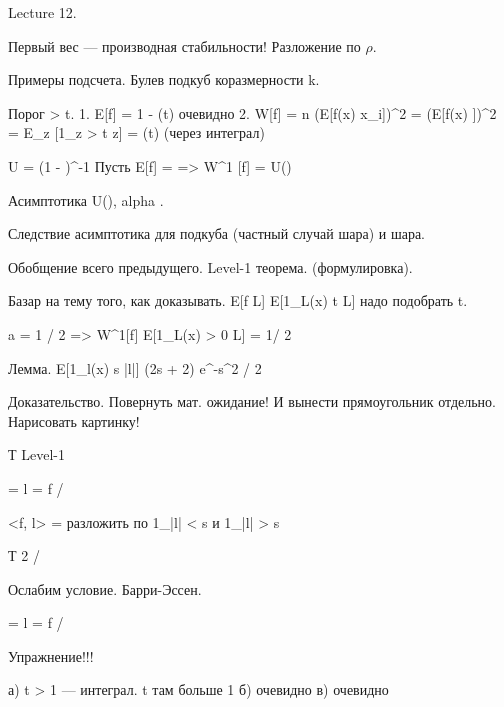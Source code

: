 Lecture 12.


Первый вес --- производная стабильности! Разложение по $\rho$.

Примеры подсчета.
Булев подкуб коразмерности k.

Порог > t. 
1. E[f] = 1 - \Phi(t) очевидно
2. W[f] = n (E[f(x) x_i])^2 = (E[f(x) \sum {}])^2 = E_z [1_{z > t} z] = \phi(t) (через интеграл)


U = \phi (1 - \Phi)^{-1}
Пусть E[f] = \alpha => W^1 [f] = U(\alpha)


Асимптотика U(\alpha), alpha .

Следствие асимптотика для подкуба (частный случай шара) и шара.


Обобщение всего предыдущего. Level-1 теорема. (формулировка).


Базар на тему того, как доказывать.
E[f L] \le E[1_{L(x) \ge t} L] надо подобрать t.

a = 1 / 2 => W^1[f] \le E[1_{L(x) > 0} L] = 1/ 2\pi \sigma


Лемма.
E[1_{l(x) \ge s} |l|] \le (2s + 2) e^{-s^2 / 2}

Доказательство. Повернуть мат. ожидание! И вынести прямоугольник отдельно. Нарисовать картинку!


Т Level-1

\sigma = 
l = f / \sigma

<f, l> = разложить по 1_{|l| < s} и 1_{|l| > s}



Т 2 / \pi

Ослабим условие. Барри-Эссен.

\sigma = 
l = f / \sigma


Упражнение!!!

а) t > 1 --- интеграл. t  там больше 1
б) очевидно
в) очевидно